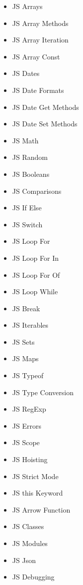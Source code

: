 \documentclass[12pt, letterpaper]{article}
\begin{document}
\begin{enumerate}
\begin{itemize}
\begin{enumerate}
\begin{itemize}
                \item JS Arrays
                \item JS Array Methods
                \item JS Array Iteration
                \item JS Array Const
                \item JS Dates
                \item JS Date Formats
                \item JS Date Get Methods
                \item JS Date Set Methods
                \item JS Math
                \item JS Random
                \item JS Booleans
                \item JS Comparisons
                \item JS If Else
                \item JS Switch
                \item JS Loop For
                \item JS Loop For In
                \item JS Loop For Of
                \item JS Loop While
                \item JS Break
                \item JS Iterables
                \item JS Sets
                \item JS Maps
                \item JS Typeof
                \item JS Type Conversion
                \item JS RegExp
                \item JS Errors
                \item JS Scope
                \item JS Hoisting
                \item JS Strict Mode
                \item JS this Keyword
                \item JS Arrow Function
                \item JS Classes
                \item JS Modules
                \item JS Json
                \item JS Debugging

\end{itemize}
\end{enumerate}
\end{itemize}
\end{enumerate}
\end{document}

